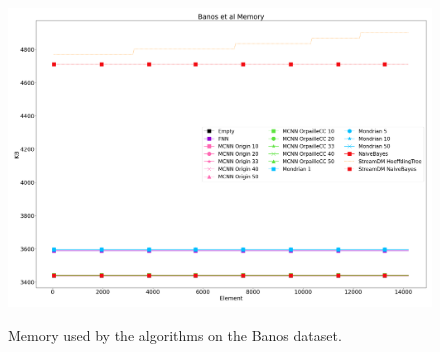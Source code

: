 \begin{figure}[H]
	\includegraphics[width=\linewidth]{figures/results/banos_3_memory.png}
	\label{fig:memory}
	\caption{Memory used by the algorithms on the Banos dataset.}
\end{figure}



